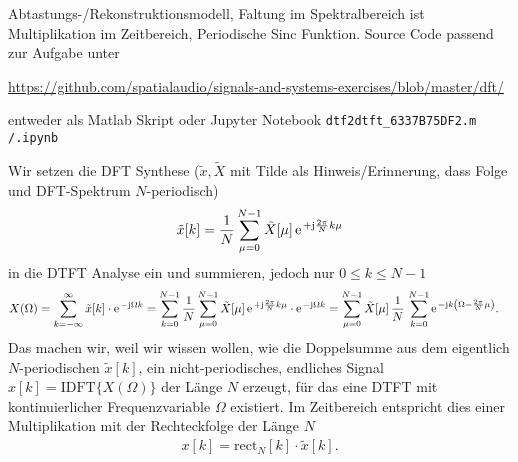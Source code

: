\begin{Werkzeug}
Abtastungs-/Rekonstruktionsmodell, Faltung im Spektralbereich ist Multiplikation
im Zeitbereich, Periodische Sinc Funktion.
%
Source Code passend zur Aufgabe unter

\url{https://github.com/spatialaudio/signals-and-systems-exercises/blob/master/dft/}

entweder als Matlab Skript oder Jupyter Notebook
\texttt{dtf2dtft\_6337B75DF2.m /.ipynb}

\end{Werkzeug}
\begin{Ansatz}
Wir setzen die DFT Synthese ($\tilde{x}, \tilde{X}$ mit Tilde als Hinweis/Erinnerung, dass Folge und DFT-Spektrum $N$-periodisch)
%
\begin{equation}
\tilde{x}[k]=\frac{1}{N} \sum_{\mu=0}^{N-1}\tilde{X}[\mu]\,\e^{+\im\frac{2\pi}{N}k\mu}
\end{equation}
%
in die DTFT Analyse ein und summieren, jedoch nur $0 \leq k \leq N-1$
\begin{align}
X(\Omega)&=\sum_{k=-\infty}^\infty \tilde{x}[k]\cdot\e^{-\im\Omega k}
=\sum_{k=0}^{N-1}\frac{1}{N}\sum_{\mu=0}^{N-1}\tilde{X}[\mu]\,\e^{+\im\frac{2\pi}{N}k\mu}\cdot\e^{-\im\Omega k}
=\sum_{\mu=0}^{N-1}\tilde{X}[\mu]\,\frac{1}{N}\,\sum_{k=0}^{N-1}\e^{-\im k\left(\Omega-\frac{2\pi}{N}\mu\right)}.
\end{align}
%
Das machen wir, weil wir wissen wollen, wie die Doppelsumme
aus dem eigentlich $N$-periodischen $\tilde{x}[k]$,
ein nicht-periodisches, endliches Signal $x[k] = \mathrm{IDFT}\{X(\Omega)\}$ der Länge $N$ erzeugt,
für das eine DTFT mit kontinuierlicher Frequenzvariable $\Omega$ existiert.
%
Im Zeitbereich entspricht dies einer Multiplikation mit der Rechteckfolge der Länge $N$
\begin{align}
x[k] = \mathrm{rect}_N[k] \cdot \tilde{x}[k].
\end{align}


\end{Ansatz}
